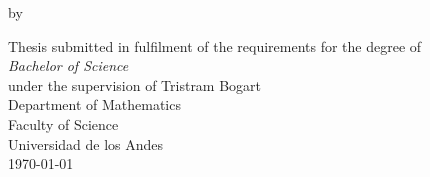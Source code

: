 \begin{titlepage}
\begin{center}

\Huge
\makeatletter
\textbf{\@title}

\Large

\vspace{3.cm}

by \textbf{\@author{}}

\vfill
\large
Thesis submitted in fulfilment of the requirements for the degree of\\
\textit{Bachelor of Science}\\
under the supervision of Tristram Bogart\\
\vfill
\large
Department of Mathematics\\
Faculty of Science\\
Universidad de los Andes\\

\today
\makeatother

\end{center}
\end{titlepage}
